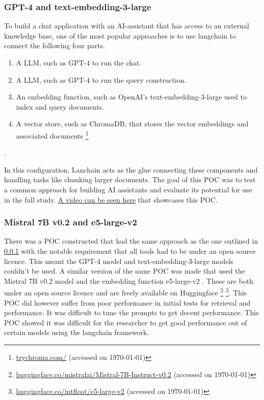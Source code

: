 \subsubsection{GPT-4 and text-embedding-3-large}
\label{sec:poc_gpt_langchain}


To build a chat application with an AI-assistant that has access to an external knowledge base, one of the most popular approaches is to use langchain to connect the following four parts.


\begin{enumerate}
        \item A \gls{LLM}, such as GPT-4 to run the chat.
        \item A \gls{LLM}, such as GPT-4 to run the query construction.
        \item An embedding function, such as OpenAI’s text-embedding-3-large used to index and query documents.
        \item A vector store, such as ChromaDB, that stores the vector embeddings and associated documents \footnote{\href{https://www.trychroma.com/}{trychroma.com/} (accessed on \today)}
\end{enumerate}.


In this configuration, Lanchain acts as the glue connecting these components and handling tasks like chunking larger documents. The goal of this \gls{POC} was to test a common approach for building AI assistants and evaluate its potential for use in the full study. \href{https://www.youtube.com/watch?v=bKjxi-NKRHo}{A video can be seen here} that showcases this \gls{POC}.


\subsubsection{Mistral 7B v0.2 and e5-large-v2}


There was a \gls{POC} constructed that had the same approach as the one outlined in \ref{sec:poc_gpt_langchain} with the notable requirement that all tools had to be under an open source licence. This meant the GPT-4 model and text-embedding-3-large models couldn’t be used. A similar version of the same \gls{POC} was made that used the Mistral 7B v0.2 model and the embedding function e5-large-v2 \cite{wang_text_2024}. These are both under an open source licence and are freely available on Huggingface \footnote{\href{https://huggingface.co/mistralai/Mistral-7B-Instruct-v0.2}{huggingface.co/mistralai/Mistral-7B-Instruct-v0.2} (accessed on \today)} \footnote{\href{https://huggingface.co/intfloat/e5-large-v2}{huggingface.co/intfloat/e5-large-v2} (accessed on \today)}. This \gls{POC} did however suffer from poor performance in initial tests for retrieval and performance. It was difficult to tune the prompts to get decent performance. This \gls{POC} showed it was difficult for the researcher to get good performance out of certain models using the langchain framework.


